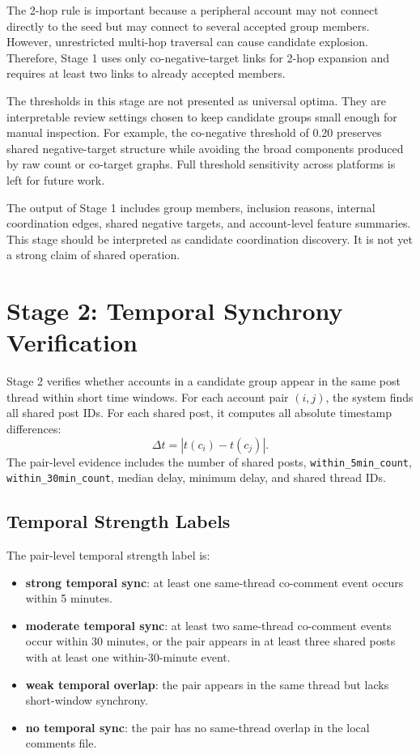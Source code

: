 \documentclass[conference]{IEEEtran}
\begin{document}
The 2-hop rule is important because a peripheral account may not connect
directly to the seed but may connect to several accepted group members.
However, unrestricted multi-hop traversal can cause candidate explosion.
Therefore, Stage 1 uses only co-negative-target links for 2-hop expansion and
requires at least two links to already accepted members.

The thresholds in this stage are not presented as universal optima. They are
interpretable review settings chosen to keep candidate groups small enough for
manual inspection. For example, the co-negative threshold of 0.20 preserves
shared negative-target structure while avoiding the broad components produced
by raw count or co-target graphs. Full threshold sensitivity across platforms
is left for future work.

The output of Stage 1 includes group members, inclusion reasons, internal
coordination edges, shared negative targets, and account-level feature
summaries. This stage should be interpreted as candidate coordination
discovery. It is not yet a strong claim of shared operation.

\section{Stage 2: Temporal Synchrony Verification}

Stage 2 verifies whether accounts in a candidate group appear in the same post
thread within short time windows. For each account pair $(i,j)$, the system
finds all shared post IDs. For each shared post, it computes all absolute
timestamp differences:
\begin{equation}
\Delta t = |t(c_i)-t(c_j)|.
\end{equation}
The pair-level evidence includes the number of shared posts,
\texttt{within\_5min\_count}, \texttt{within\_30min\_count}, median delay,
minimum delay, and shared thread IDs.

\subsection{Temporal Strength Labels}

The pair-level temporal strength label is:
\begin{itemize}
  \item \textbf{strong temporal sync}: at least one same-thread co-comment
  event occurs within 5 minutes.
  \item \textbf{moderate temporal sync}: at least two same-thread co-comment
  events occur within 30 minutes, or the pair appears in at least three shared
  posts with at least one within-30-minute event.
  \item \textbf{weak temporal overlap}: the pair appears in the same thread
  but lacks short-window synchrony.
  \item \textbf{no temporal sync}: the pair has no same-thread overlap in the
  local comments file.
\end{itemize}
\end{document}
